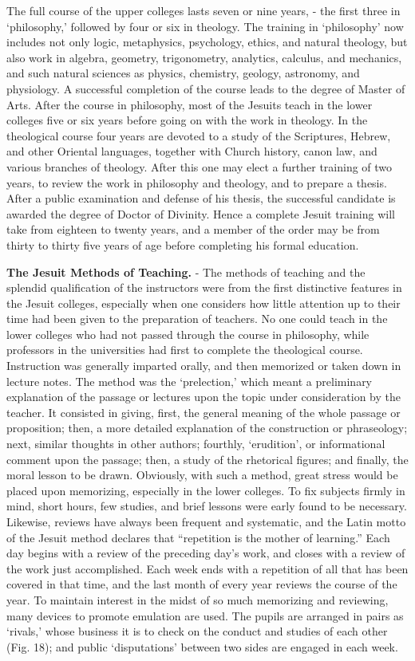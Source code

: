 \documentclass[
]{book}
\begin{document}
The full course of the upper colleges lasts seven or nine years, - the first three in `philosophy,' followed by four or six in theology. The training in `philosophy' now includes not only logic, metaphysics, psychology, ethics, and natural theology, but also work in algebra, geometry, trigonometry, analytics, calculus, and mechanics, and such natural sciences as physics, chemistry, geology, astronomy, and physiology. A successful completion of the course leads to the degree of Master of Arts. After the course in philosophy, most of the Jesuits teach in the lower colleges five or six years before going on with the work in theology. In the theological course four years are devoted to a study of the Scriptures, Hebrew, and other Oriental languages, together with Church history, canon law, and various branches of theology. After this one may elect a further training of two years, to review the work in philosophy and theology, and to prepare a thesis. After a public examination and defense of his thesis, the successful candidate is awarded the degree of Doctor of Divinity. Hence a complete Jesuit training will take from eighteen to twenty years, and a member of the order may be from thirty to thirty five years of age before completing his formal education.

\textbf{The Jesuit Methods of Teaching.} - The methods of teaching and the splendid qualification of the instructors were from the first distinctive features in the Jesuit colleges, especially when one considers how little attention up to their time had been given to the preparation of teachers. No one could teach in the lower colleges who had not passed through the course in philosophy, while professors in the universities had first to complete the theological course. Instruction was generally imparted orally, and then memorized or taken down in lecture notes. The method was the `prelection,' which meant a preliminary explanation of the passage or lectures upon the topic under consideration by the teacher. It consisted in giving, first, the general meaning of the whole passage or proposition; then, a more detailed explanation of the construction or phraseology; next, similar thoughts in other authors; fourthly, `erudition', or informational comment upon the passage; then, a study of the rhetorical figures; and finally, the moral lesson to be drawn. Obviously, with such a method, great stress would be placed upon memorizing, especially in the lower colleges. To fix subjects firmly in mind, short hours, few studies, and brief lessons were early found to be necessary. Likewise, reviews have always been frequent and systematic, and the Latin motto of the Jesuit method declares that ``repetition is the mother of learning.'' Each day begins with a review of the preceding day's work, and closes with a review of the work just accomplished. Each week ends with a repetition of all that has been covered in that time, and the last month of every year reviews the course of the year. To maintain interest in the midst of so much memorizing and reviewing, many devices to promote emulation are used. The pupils are arranged in pairs as `rivals,' whose business it is to check on the conduct and studies of each other (Fig. 18); and public `disputations' between two sides are engaged in each week.
\end{document}
